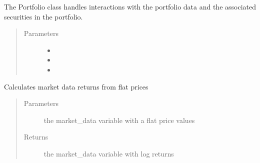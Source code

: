 \documentclass[letterpaper,10pt,english]{sphinxmanual}
\begin{document}
\begin{fulllineitems}
\label{\detokenize{securities:risk_dash.securities.Portfolio}}
The Portfolio class handles interactions with the portfolio data and the associated securities in the portfolio.
\begin{quote}\begin{description}
\item[{Parameters}] \leavevmode\begin{itemize}
\item {} 
 \textendash{} 

\item {} 
 \textendash{} 

\item {} 
 \textendash{} 

\end{itemize}

\end{description}\end{quote}

\begin{fulllineitems}
\label{\detokenize{securities:risk_dash.securities.Portfolio.calculate_portfolio_returns}}
Calculates market data returns from flat prices
\begin{quote}\begin{description}
\item[{Parameters}] \leavevmode
{} \textendash{} the market\_data variable with a flat price values

\item[{Returns}] \leavevmode
the market\_data variable with log returns

\end{description}\end{quote}

\end{fulllineitems}



\end{fulllineitems}
\end{document}
